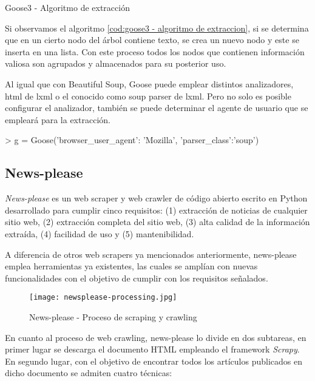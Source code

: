 \begin{codefloat}
  
  \caption{Goose3 - Algoritmo de extracción}
  \label{cod:goose3 - algoritmo de extraccion}
\end{codefloat}

Si observamos el algoritmo \ref{cod:goose3 - algoritmo de extraccion}, si se determina que en un cierto
nodo del árbol contiene texto, se crea un nuevo nodo y este se inserta en una lista. Con este proceso
todos los nodos que contienen información valiosa son agrupados y almacenados para su posterior uso.

Al igual que con Beautiful Soup, Goose puede emplear distintos analizadores, html de lxml o el conocido como
soup parser de lxml. Pero no solo es posible configurar el analizador, también se puede determinar el agente
de usuario que se empleará para la extracción.

\begin{Schunk}
  \begin{Soutput}
    > g = Goose({'browser_user_agent': 'Mozilla', 'parser_class':'soup'})
  \end{Soutput}
\end{Schunk}

\subsection{News-please}
\label{subsec:news-please}

\emph{News-please} \cite{news-please} es un web scraper y web crawler de código abierto escrito en Python
desarrollado para cumplir cinco requisitos: (1) extracción de noticias de cualquier sitio web, (2) extracción
completa del sitio web, (3) alta calidad de la información extraída, (4) facilidad de uso y (5) mantenibilidad.

A diferencia de otros web scrapers ya mencionados anteriormente, news-please emplea herramientas ya existentes,
las cuales se amplían con nuevas funcionalidades con el objetivo de cumplir con los requisitos señalados.

\begin{figure}[tphb]
  \centering
  \texttt{[image: newsplease-processing.jpg]}
  \caption{News-please - Proceso de scraping y crawling}
  \label{img:news-please - proceso de scraping y crawling}
\end{figure}

En cuanto al proceso de web crawling, news-please lo divide en dos subtareas, en primer lugar se descarga 
el documento HTML empleando el framework \emph{Scrapy}. En segundo lugar, con el objetivo de encontrar 
todos los artículos publicados en dicho documento se admiten cuatro técnicas:

